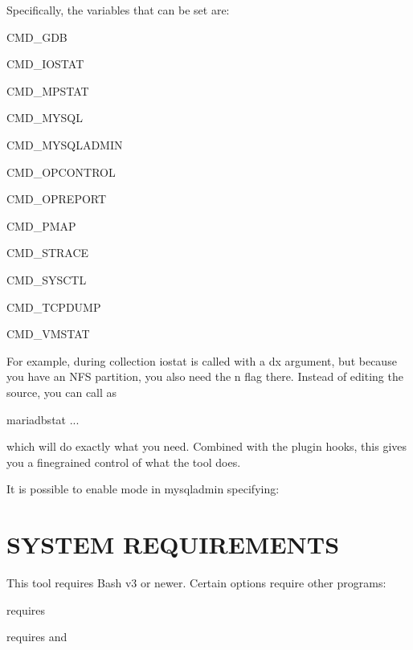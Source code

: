\documentclass[letterpaper,10pt,english]{sphinxmanual}
\begin{document}
Specifically, the variables that can be set are:

CMD\_GDB

CMD\_IOSTAT

CMD\_MPSTAT

CMD\_MYSQL

CMD\_MYSQLADMIN

CMD\_OPCONTROL

CMD\_OPREPORT

CMD\_PMAP

CMD\_STRACE

CMD\_SYSCTL

CMD\_TCPDUMP

CMD\_VMSTAT

For example, during collection iostat is called with a \sphinxhyphen{}dx argument, but
because you have an NFS partition, you also need the \sphinxhyphen{}n flag there.  Instead
of editing the source, you can call  as

\begin{sphinxVerbatim}[commandchars=\\\{\}]
 mariadb\PYGZhy{}stat ...
\end{sphinxVerbatim}

which will do exactly what you need.  Combined with the plugin hooks, this
gives you a fine\sphinxhyphen{}grained control of what the tool does.

It is possible to enable  mode in mysqladmin specifying:



\section{SYSTEM REQUIREMENTS}
\label{\detokenize{mariadb-stat:system-requirements}}
This tool requires Bash v3 or newer.  Certain options require other programs:

{\hyperref[\detokenize{mariadb-stat:cmdoption-mariadb-stat-collect-gdb}]{}} requires 

{\hyperref[\detokenize{mariadb-stat:cmdoption-mariadb-stat-collect-oprofile}]{}} requires  and 
\end{document}
